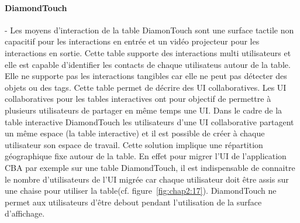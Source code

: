 \paragraph {DiamondTouch}-
\label{sec:chap2:3:1:1}
Les moyens d'interaction de la table DiamonTouch sont une surface tactile non capacitif pour les interactions en entrée et un vidéo projecteur pour les interactions en sortie. Cette table supporte des interactions multi utilisateurs et elle est capable d'identifier  les contacts de chaque utilisateus autour de la table. Elle ne supporte pas les interactions tangibles car elle ne peut pas détecter des objets ou des tags. Cette table permet de décrire des UI collaboratives. Les UI collaboratives pour les tables interactives ont pour objectif de permettre à plusieurs utilisateurs de partager en même temps une UI.  Dans le cadre de la  table interactive DiamondTouch les utilisateurs d'une UI collaborative partagent un même espace (la table interactive) et il est possible de créer à chaque utilisateur son espace de travail. Cette solution implique une répartition géographique fixe autour de la table. En effet pour migrer l'UI de l'application CBA par exemple sur une table DiamondTouch, il est indispensable de connaitre le nombre d'utilisateurs de l'UI migrée car chaque utilisateur doit être assis sur une chaise pour utiliser la table(cf. figure~\ref{fig:chap2:17}). DiamondTouch ne permet aux utilisateurs d'être debout pendant l'utilisation de la surface d'affichage.  
 
